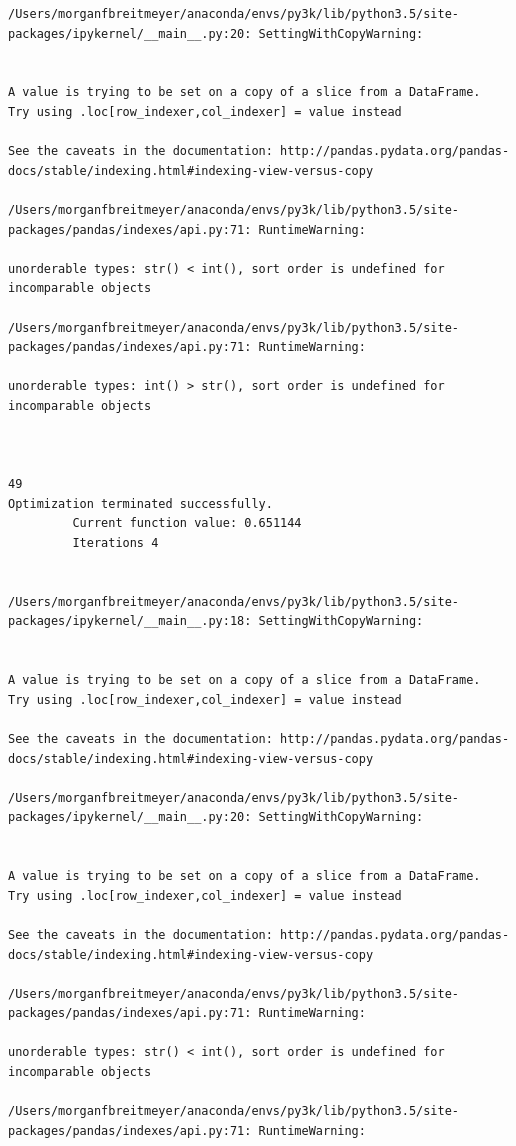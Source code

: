 \begin{lstlisting}
/Users/morganfbreitmeyer/anaconda/envs/py3k/lib/python3.5/site-packages/ipykernel/__main__.py:20: SettingWithCopyWarning:


A value is trying to be set on a copy of a slice from a DataFrame.
Try using .loc[row_indexer,col_indexer] = value instead

See the caveats in the documentation: http://pandas.pydata.org/pandas-docs/stable/indexing.html#indexing-view-versus-copy

/Users/morganfbreitmeyer/anaconda/envs/py3k/lib/python3.5/site-packages/pandas/indexes/api.py:71: RuntimeWarning:

unorderable types: str() < int(), sort order is undefined for incomparable objects

/Users/morganfbreitmeyer/anaconda/envs/py3k/lib/python3.5/site-packages/pandas/indexes/api.py:71: RuntimeWarning:

unorderable types: int() > str(), sort order is undefined for incomparable objects



49
Optimization terminated successfully.
         Current function value: 0.651144
         Iterations 4


/Users/morganfbreitmeyer/anaconda/envs/py3k/lib/python3.5/site-packages/ipykernel/__main__.py:18: SettingWithCopyWarning:


A value is trying to be set on a copy of a slice from a DataFrame.
Try using .loc[row_indexer,col_indexer] = value instead

See the caveats in the documentation: http://pandas.pydata.org/pandas-docs/stable/indexing.html#indexing-view-versus-copy

/Users/morganfbreitmeyer/anaconda/envs/py3k/lib/python3.5/site-packages/ipykernel/__main__.py:20: SettingWithCopyWarning:


A value is trying to be set on a copy of a slice from a DataFrame.
Try using .loc[row_indexer,col_indexer] = value instead

See the caveats in the documentation: http://pandas.pydata.org/pandas-docs/stable/indexing.html#indexing-view-versus-copy

/Users/morganfbreitmeyer/anaconda/envs/py3k/lib/python3.5/site-packages/pandas/indexes/api.py:71: RuntimeWarning:

unorderable types: str() < int(), sort order is undefined for incomparable objects

/Users/morganfbreitmeyer/anaconda/envs/py3k/lib/python3.5/site-packages/pandas/indexes/api.py:71: RuntimeWarning:


\end{lstlisting}
